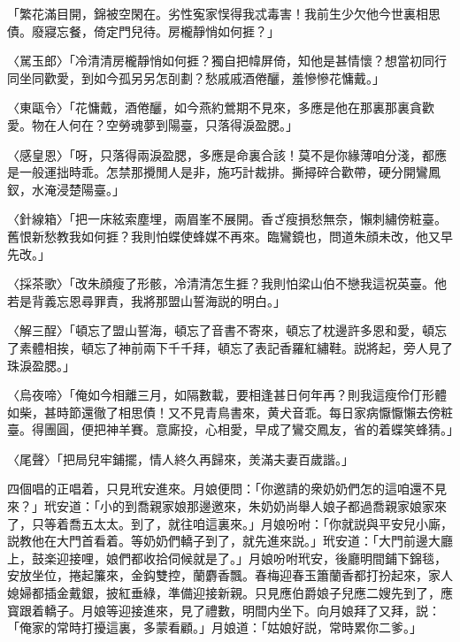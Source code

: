 「繁花滿目開，錦被空閑在。劣性寃家悮得我忒毒害！我前生少欠他今世裏相思債。廢寢忘餐，倚定門兒待。房櫳靜悄如何捱？」

〈駡玉郎〉「冷清清房櫳靜悄如何捱？獨自把幃屏倚，知他是甚情懷？想當初同行同坐同歡愛，到如今孤另另怎㓦劃？愁戚戚酒倦釃，羞慘慘花慵戴。」

〈東甌令〉「花慵戴，酒倦釃，如今燕約鶯期不見來，多應是他在那裏那裏貪歡愛。物在人何在？空勞魂夢到陽臺，只落得淚盈腮。」

〈感皇恩〉「呀，只落得兩淚盈腮，多應是命裏合該！莫不是你緣薄咱分淺，都應是一般運拙時乖。怎禁那攪閒人是非，施巧計裁排。撕撏碎合歡帶，硬分開鸞鳳釵，水淹浸楚陽臺。」

〈針線箱〉「把一床絃索塵埋，兩眉峯不展開。香ざ瘦損愁無奈，懶刺繡傍粧臺。舊恨新愁教我如何捱？我則怕蝶使蜂媒不再來。臨鸞鏡也，問道朱顔未改，他又早先改。」

〈採茶歌〉「改朱顔瘦了形骸，冷清清怎生捱？我則怕梁山伯不戀我這祝英臺。他若是背義忘恩尋罪責，我將那盟山誓海説的明白。」

〈解三酲〉「頓忘了盟山誓海，頓忘了音書不寄來，頓忘了枕邊許多恩和愛，頓忘了素體相挨，頓忘了神前兩下千千拜，頓忘了表記香羅紅繡鞋。説將起，旁人見了珠淚盈腮。」

〈烏夜啼〉「俺如今相離三月，如隔數載，要相逢甚日何年再？則我這瘦伶仃形體如柴，甚時節還徹了相思債！又不見青鳥書來，黄犬音乖。每日家病懨懨懶去傍粧臺。得團圓，便把神羊賽。意廝投，心相愛，早成了鸞交鳳友，省的着蝶笑蜂猜。」

〈尾聲〉「把局兒牢鋪擺，情人終久再歸來，羙滿夫妻百歲諧。」

四個唱的正唱着，只見玳安進來。月娘便問：「你邀請的衆奶奶們怎的這咱還不見來？」玳安道：「小的到喬親家娘那邊邀來，朱奶奶尚舉人娘子都過喬親家娘家來了，只等着喬五太太。到了，就往咱這裏來。」月娘吩咐：「你就説與平安兒小廝，説教他在大門首看着。等奶奶們轎子到了，就先進來説。」玳安道：「大門前邊大廳上，鼓楽迎接哩，娘們都收拾伺候就是了。」月娘吩咐玳安，後廳明間鋪下錦毯，安放坐位，捲起簾來，金鈎雙控，蘭麝香飄。春梅迎春玉簫蘭香都打扮起來，家人媳婦都插金戴銀，披紅垂綠，準備迎接新親。只見應伯爵娘子兒應二嫂先到了，應寳跟着轎子。月娘等迎接進來，見了禮數，明間内坐下。向月娘拜了又拜，説：「俺家的常時打擾這裏，多蒙看顧。」月娘道：「姑娘好説，常時累你二爹。」

